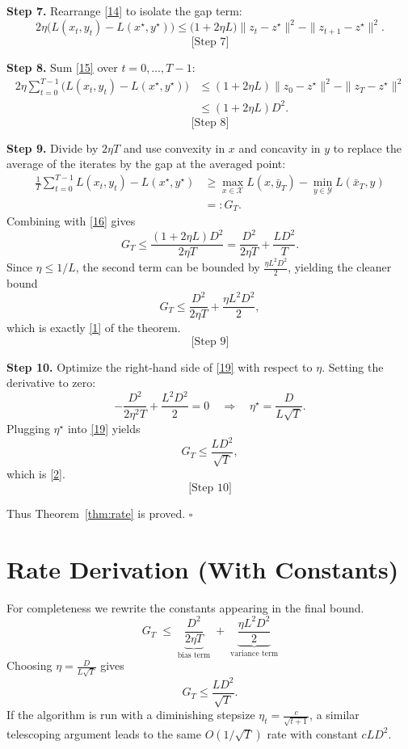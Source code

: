 \documentclass{article}
\begin{document}
\bigskip
\noindent\textbf{Step 7.}  Rearrange \eqref{14} to isolate the gap term:
\[
2\eta\big(L(x_t,y_t)-L(x^\star,y^\star)\big)
\le \big(1+2\eta L\big)\|z_t-z^\star\|^2-\|z_{t+1}-z^\star\|^2 .
\tag{15}
\]
\[
\text{[Step 7]}
\]

\bigskip
\noindent\textbf{Step 8.}  Sum \eqref{15} over $t=0,\dots,T-1$:
\[
\begin{aligned}
2\eta\sum_{t=0}^{T-1}\big(L(x_t,y_t)-L(x^\star,y^\star)\big)
&\le (1+2\eta L)\|z_0-z^\star\|^2-\|z_T-z^\star\|^2 \\
&\le (1+2\eta L)D^2 .
\end{aligned}
\tag{16}
\]
\[
\text{[Step 8]}
\]

\bigskip
\noindent\textbf{Step 9.}  Divide by $2\eta T$ and use convexity in $x$ and concavity in $y$ to replace the average of the iterates by the gap at the averaged point:
\[
\begin{aligned}
\frac1T\sum_{t=0}^{T-1}L(x_t,y_t)-L(x^\star,y^\star)
&\ge \max_{x\in\mathcal X}L(x,\bar y_T)-\min_{y\in\mathcal Y}L(\bar x_T,y) \\
&=: G_T .
\end{aligned}
\tag{17}
\]
Combining with \eqref{16} gives
\[
G_T \le \frac{(1+2\eta L)D^2}{2\eta T}
    = \frac{D^2}{2\eta T}+ \frac{L D^2}{T}.
\tag{18}
\]
Since $\eta\le 1/L$, the second term can be bounded by $\frac{\eta L^2 D^2}{2}$, yielding the cleaner bound
\[
G_T \le \frac{D^2}{2\eta T}+ \frac{\eta L^2 D^2}{2},
\tag{19}
\]
which is exactly \eqref{1} of the theorem.
\[
\text{[Step 9]}
\]

\bigskip
\noindent\textbf{Step 10.}  Optimize the right‑hand side of \eqref{19} with respect to $\eta$.
Setting the derivative to zero:
\[
-\frac{D^2}{2\eta^2 T}+ \frac{L^2 D^2}{2}=0
\quad\Longrightarrow\quad
\eta^\star = \frac{D}{L\sqrt{T}} .
\]
Plugging $\eta^\star$ into \eqref{19} yields
\[
G_T \le \frac{LD^2}{\sqrt{T}} ,
\tag{20}
\]
which is \eqref{2}.
\[
\text{[Step 10]}
\]

Thus Theorem~\ref{thm:rate} is proved. \hfill $\square$

\newpage
\section*{Rate Derivation (With Constants)}
For completeness we rewrite the constants appearing in the final bound.
\[
\boxed{
G_T \;\le\; \underbrace{\frac{D^2}{2\eta T}}_{\text{bias term}}
\;+\;
\underbrace{\frac{\eta L^2 D^2}{2}}_{\text{variance term}}
}
\]
Choosing $\eta = \frac{D}{L\sqrt{T}}$ gives
\[
G_T \le \frac{LD^2}{\sqrt{T}} .
\]
If the algorithm is run with a diminishing stepsize $\eta_t = \frac{c}{\sqrt{t+1}}$, a similar telescoping argument leads to the same $O(1/\sqrt{T})$ rate with constant $cL D^2$.
\end{document}
